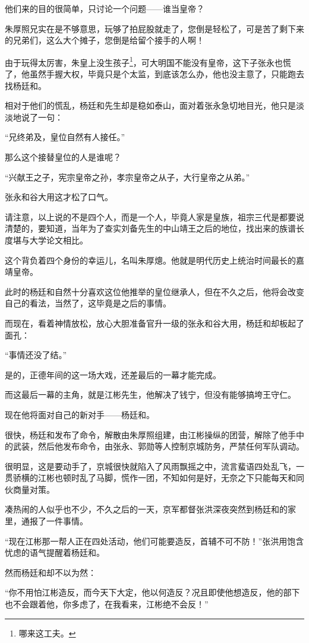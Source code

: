 \begin{multicols}{\theparacolNo}
他们来的目的很简单，只讨论一个问题——谁当皇帝？

朱厚照兄实在是不够意思，玩够了拍屁股就走了，您倒是轻松了，可是苦了剩下来的兄弟们，这么大个摊子，您倒是给留个接手的人啊！

由于玩得太厉害，朱皇上没生孩子\footnote{哪来这工夫。}，可大明国不能没有皇帝，这下子张永也慌了，他虽然手握大权，毕竟只是个太监，到底该怎么办，他也没主意了，只能跑去找杨廷和。

相对于他们的慌乱，杨廷和先生却是稳如泰山，面对着张永急切地目光，他只是淡淡地说了一句：

“兄终弟及，皇位自然有人接任。”

那么这个接替皇位的人是谁呢？

“兴献王之子，宪宗皇帝之孙，孝宗皇帝之从子，大行皇帝之从弟。”

张永和谷大用这才松了口气。

请注意，以上说的不是四个人，而是一个人，毕竟人家是皇族，祖宗三代是都要说清楚的，要知道，当年为了查实刘备先生的中山靖王之后的地位，找出来的族谱长度堪与大学论文相比。

这个背负着四个身份的幸运儿，名叫朱厚熜。他就是明代历史上统治时间最长的嘉靖皇帝。

此时的杨廷和自然十分喜欢这位他推举的皇位继承人，但在不久之后，他将会改变自己的看法，当然了，这毕竟是之后的事情。

而现在，看着神情放松，放心大胆准备官升一级的张永和谷大用，杨廷和却板起了面孔：

“事情还没了结。”

是的，正德年间的这一场大戏，还差最后的一幕才能完成。

而这最后一幕的主角，就是江彬先生，他解决了钱宁，但没有能够搞垮王守仁。

现在他将面对自己的新对手——杨廷和。

很快，杨廷和发布了命令，解散由朱厚照组建，由江彬操纵的团营，解除了他手中的武装，然后他发布命令，由张永、郭勋等人控制京城防务，严禁任何军队调动。

很明显，这是要动手了，京城很快就陷入了风雨飘摇之中，流言蜚语四处乱飞，一贯骄横的江彬也顿时乱了马脚，慌作一团，不知如何是好，无奈之下只能每天和同伙商量对策。

凑热闹的人似乎也不少，不久之后的一天，京军都督张洪深夜突然到杨廷和的家里，通报了一件事情。

“现在江彬那一帮人正在四处活动，他们可能要造反，首辅不可不防！”张洪用饱含忧虑的语气提醒着杨廷和。

然而杨廷和却不以为然：

“你不用怕江彬造反，而今天下大定，他以何造反？况且即使他想造反，他的部下也不会跟着他，你多虑了，在我看来，江彬绝不会反！”


\end{multicols}
